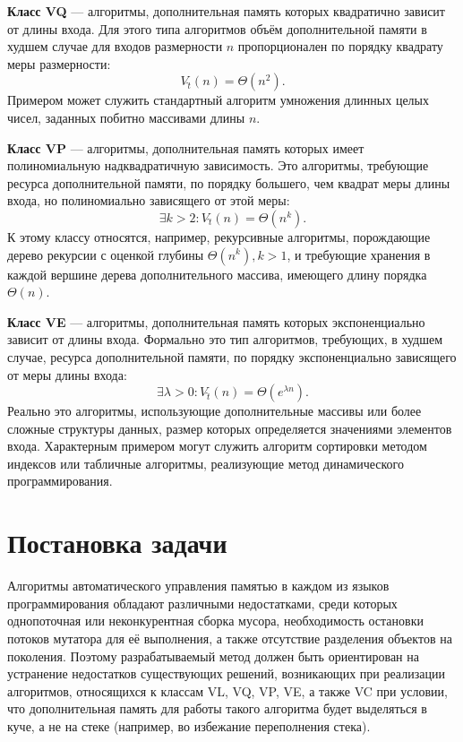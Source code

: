\textbf{Класс VQ} --- алгоритмы, дополнительная память которых квадратично зависит от длины входа. Для этого типа алгоритмов объём дополнительной памяти в худшем случае для входов размерности $n$ пропорционален по порядку квадрату меры размерности:
\begin{equation}
	V\hat{_t}(n) = \Theta(n^2).
\end{equation}
Примером может служить стандартный алгоритм умножения длинных целых чисел, заданных побитно массивами длины $n$.~\cite{uljanov}

\textbf{Класс VP} --- алгоритмы, дополнительная память которых имеет полиномиальную надквадратичную зависимость. Это алгоритмы, требующие ресурса дополнительной памяти, по порядку большего, чем квадрат меры длины входа, но полиномиально зависящего от этой меры:
\begin{equation}
	\exists k > 2: V\hat{_t}(n) = \Theta(n^k).
\end{equation}	
К этому классу относятся, например, рекурсивные алгоритмы, порождающие дерево рекурсии с оценкой глубины $\Theta(n^k), k > 1$, и требующие хранения в каждой вершине дерева дополнительного массива, имеющего длину порядка $\Theta(n)$.~\cite{uljanov}

\textbf{Класс VE} --- алгоритмы, дополнительная память которых экспоненциально зависит от длины входа. Формально это тип алгоритмов, требующих, в худшем случае, ресурса дополнительной памяти, по порядку экспоненциально зависящего от меры длины входа:
\begin{equation}
	\exists \lambda > 0: V\hat{_t}(n) = \Theta(e^{\lambda n}).
\end{equation}
Реально это алгоритмы, использующие дополнительные массивы или более сложные структуры данных, размер которых определяется значениями элементов входа. Характерным примером могут служить алгоритм сортировки методом индексов или табличные алгоритмы, реализующие метод динамического программирования.~\cite{uljanov}


\section{Постановка задачи}

Алгоритмы автоматического управления памятью в каждом из языков программирования обладают различными недостатками, среди которых однопоточная или неконкурентная сборка мусора, необходимость остановки потоков мутатора для её выполнения, а также отсутствие разделения объектов на поколения. Поэтому разрабатываемый метод должен быть ориентирован на устранение недостатков существующих решений, возникающих при реализации алгоритмов, относящихся к классам VL, VQ, VP, VE, а также VC при условии, что дополнительная память для работы такого алгоритма будет выделяться в куче, а не на стеке (например, во избежание переполнения стека).

